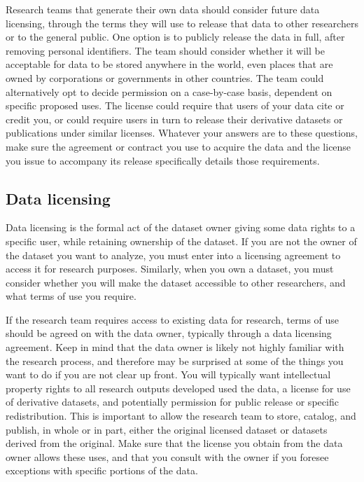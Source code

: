 Research teams that generate their own data
should consider future data licensing,
through the terms they will use to release that data
to other researchers or to the general public.
One option is to publicly release the data in full,
after removing personal identifiers.
The team should consider whether it will be acceptable for data to
be stored anywhere in the world,
even places that are owned by corporations or governments in other countries.
The team could alternatively opt to decide permission on a case-by-case basis,
dependent on specific proposed uses.
The license could require that users of your data cite or credit you,
or could require users in turn to release
their derivative datasets or publications under similar licenses.
Whatever your answers are to these questions,
make sure the agreement or contract
you use to acquire the data
and the license you issue to accompany its release
specifically details those requirements.

\subsection{Data licensing}
Data licensing is the formal act of the dataset owner
giving some data rights to a specific user,
while retaining ownership of the dataset.
If you are not the owner of the dataset you want to analyze,
you must enter into a licensing agreement to access it for research purposes.
Similarly, when you own a dataset,
you must consider whether you will make the dataset accessible to other researchers,
and what terms of use you require.

If the research team requires access to existing data for research,
terms of use should be agreed on with the data owner,
typically through a data licensing agreement.
Keep in mind that the data owner is likely not highly familiar
with the research process, and therefore may be surprised
at some of the things you want to do if you are not clear up front.
You will typically want intellectual property rights
to all research outputs developed used the data,
a license for use of derivative datasets,
and potentially permission for public release or specific redistribution.
This is important to allow the research team
to store, catalog, and publish, in whole or in part,
either the original licensed dataset or datasets derived from the original.
Make sure that the license you obtain from the data owner allows these uses,
and that you consult with the owner
if you foresee exceptions with specific portions of the data.

